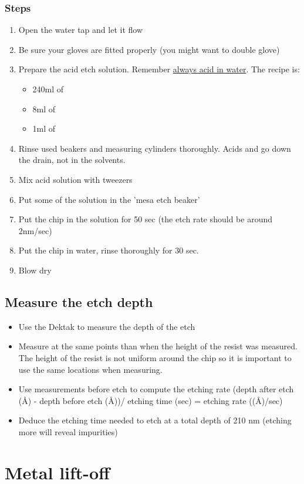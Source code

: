\documentclass[12pt,a4paper]{report}
\begin{document}
\subsubsection{Steps}
\begin{enumerate}
\item Open the water tap and let it flow
\item Be sure your gloves are fitted properly (you might want to double glove)
\item Prepare the acid etch solution. Remember \underline{always acid in water}. The recipe is:
  \begin{itemize}
  \item 240ml of 
  \item 8ml of 
  \item 1ml of 
  \end{itemize}
\item Rinse used beakers and measuring cylinders thoroughly. Acids and  go down the drain, not in the solvents.
\item Mix acid solution with tweezers
\item Put some of the solution in the 'mesa etch beaker'
\item Put the chip in the solution for 50 sec (the etch rate should be around 2nm/sec)
\item Put the chip in water, rinse thoroughly for 30 sec.
\item Blow dry
\end{enumerate}
\subsection{Measure the etch depth}
\begin{itemize}
\item Use the Dektak to measure the depth of the etch
\item Measure at the same points than when the height of the resist was measured. The height of the resist is not uniform around the chip so it
is important to use the same locations when measuring.
\item Use measurements before etch to compute the etching rate (depth after etch (\AA) - depth before etch (\AA))/ etching time (sec) = etching rate ((\AA)/sec)
\item Deduce the etching time needed to etch at a total depth of 210 nm (etching more will reveal impurities)
\end{itemize}
\newpage

\section{Metal lift-off}
\end{document}
